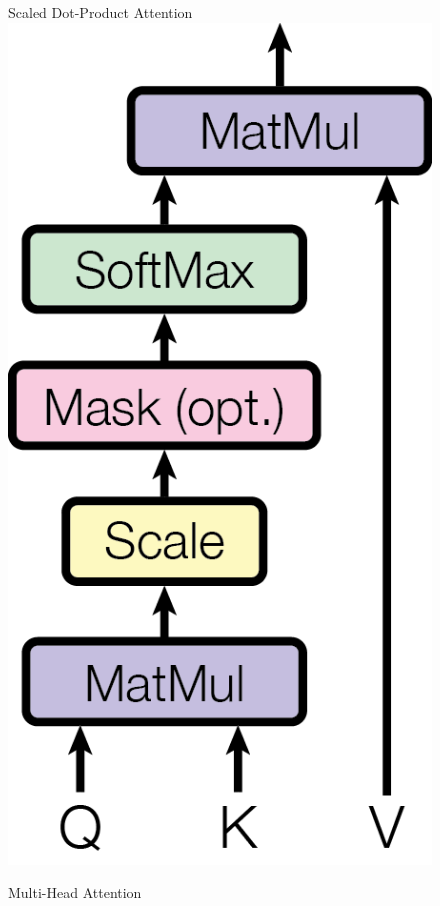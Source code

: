 \begin{figure}[htbp]
\begin{minipage}[t]{0.5\textwidth}
  \centering
  Scaled Dot-Product Attention \\
  \vspace{0.5cm}
  \includegraphics[scale=0.6]{assets/ModalNet-19}
\end{minipage}
\begin{minipage}[t]{0.5\textwidth}
  \centering 
  Multi-Head Attention \\

\end{minipage}
\end{figure}
